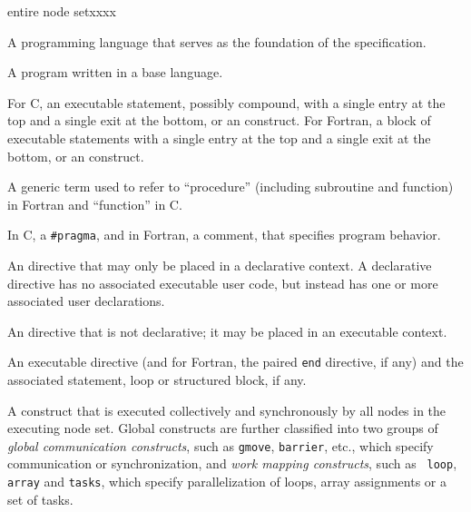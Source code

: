 \begin{namelist}{entire node setxxxx}


 A programming language that serves as the foundation of the {\XMP}
 specification.


 A program written in a base language.


 For C, an executable statement, possibly compound, with a single entry
 at the top and a single exit at the bottom, or an {\XMP} construct.
 For Fortran, a block of executable statements with a single entry at
 the top and a single exit at the bottom, or an {\XMP} construct.


 A generic term used to refer to ``procedure'' (including subroutine and
 function) in Fortran and ``function'' in C.


 In C, a {\tt \#pragma}, and in Fortran, a comment, that specifies
 {\XMP} program behavior.


 An {\XMP} directive that may only be placed in a declarative context. A
 declarative directive has no associated executable user code, but
 instead has one or more associated user declarations.


 An {\XMP} directive that is not declarative; it may be placed in an
 executable context.


 An {\XMP} executable directive (and for Fortran, the paired {\tt end}
 directive, if any) and the associated statement, loop or structured
 block, if any.



 A construct that is executed collectively and synchronously by all
 nodes in the executing node set. Global constructs are further
 classified into two groups of {\it global communication constructs},
 such as {\tt gmove}, {\tt barrier}, etc., which specify communication
 or synchronization, and {\it work mapping constructs}, such as {\tt
 loop}, {\tt array} and {\tt tasks}, which specify parallelization of
 loops, array assignments or a set of tasks.


\end{namelist}
